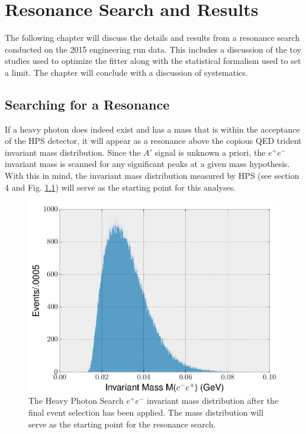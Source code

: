 
\chapter{Resonance Search and Results}

The following chapter will discuss the details and results from a resonance 
search conducted on the 2015 engineering run data.  This includes a discussion
of the toy studies used to optimize the fitter along with the statistical 
formalism used to set a limit.  The chapter will conclude with a discussion 
of systematics.

\section{Searching for a Resonance}

If a heavy photon does indeed exist and has a mass that is within the acceptance
of the HPS detector, it will appear as a resonance above the copious QED trident
invariant mass distribution.  Since the $A'$ signal is unknown a priori, the 
$e^+e^-$ invariant mass is scanned for any significant peaks at a given mass 
hypothesis.  With this in mind, the invariant mass distribution measured by
HPS (see section 4 and Fig. \ref{fig:mass_distribution}) will serve as the 
starting point for this analyses.
\begin{figure}[t]
    \centering
    \includegraphics[width=1.0\textwidth]{images/invariant_mass_final.png}
    \caption{The Heavy Photon Search $e^+e^-$ invariant mass distribution after
             the final event selection has been applied.  The mass distribution
             will serve as the starting point for the resonance search.}
    \label{fig:mass_distribution}
\end{figure}

